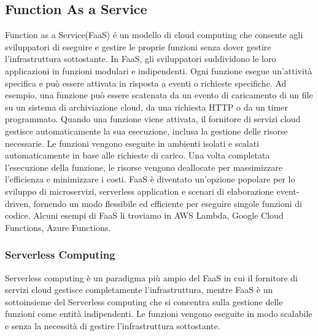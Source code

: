 \documentclass[../main.tex]{subfiles}
\begin{document}
\subsection{Function As a  Service}
Function as a Service(FaaS) é un modello di cloud computing che consente agli sviluppatori di eseguire e gestire le proprie funzioni senza dover gestire l'infrastruttura sottostante.
In FaaS, gli sviluppatori suddividono le loro applicazioni in funzioni modulari e indipendenti. Ogni funzione esegue un'attività specifica e può essere attivata in risposta a eventi o richieste specifiche. Ad esempio, una funzione può essere scatenata da un evento di caricamento di un file su un sistema di archiviazione cloud, da una richiesta HTTP o da un timer programmato. Quando una funzione viene attivata, il fornitore di servizi cloud gestisce automaticamente la sua esecuzione, inclusa la gestione delle risorse necessarie. Le funzioni vengono eseguite in ambienti isolati e scalati automaticamente in base alle richieste di carico. Una volta completata l'esecuzione della funzione, le risorse vengono deallocate per massimizzare l'efficienza e minimizzare i costi.
FaaS è diventato un'opzione popolare per lo sviluppo di microservizi, serverless application e scenari di elaborazione event-driven, fornendo un modo flessibile ed efficiente per eseguire singole funzioni di codice.
Alcuni esempi di FaaS li troviamo in AWS Lambda, Google Cloud Functions, Azure Functions.

\subsubsection{Serverless Computing}
Serverless computing è un paradigma più ampio del FaaS in cui il fornitore di servizi cloud gestisce completamente l'infrastruttura, mentre FaaS è un sottoinsieme del Serverless computing che si concentra sulla gestione delle funzioni come entità indipendenti. Le funzioni vengono eseguite in modo scalabile e senza la necessità di gestire l'infrastruttura sottostante.
\autocite{amslaurea24930}
\end{document}
